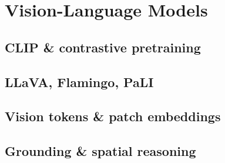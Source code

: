 
\section{Vision-Language Models}

\subsection{CLIP \& contrastive pretraining}


\subsection{LLaVA, Flamingo, PaLI}


\subsection{Vision tokens \& patch embeddings}


\subsection{Grounding \& spatial reasoning}



